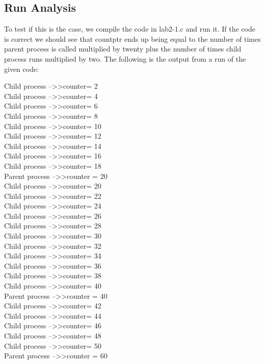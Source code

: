 \documentclass[12pt, titlepage]{article}
\begin{document}
\subsection*{Run Analysis}
\par{} 
To test if this is the case, we compile the code in lab2-1.c and run it. 
If the code is correct we should see that countptr ends up being equal to
the number of times parent process is called multiplied by twenty plus the number 
of times child process runs multiplied by two.
The following is the output from a run of the given code:
\begin{center}
	Child process --\textgreater\textgreater counter= 2\\
Child process --\textgreater\textgreater counter= 4\\
Child process --\textgreater\textgreater counter= 6\\
Child process --\textgreater\textgreater counter= 8\\
Child process --\textgreater\textgreater counter= 10\\
Child process --\textgreater\textgreater counter= 12\\
Child process --\textgreater\textgreater counter= 14\\
Child process --\textgreater\textgreater counter= 16\\
Child process --\textgreater\textgreater counter= 18\\
Parent process --\textgreater\textgreater counter = 20\\
Child process --\textgreater\textgreater counter= 20\\
Child process --\textgreater\textgreater counter= 22\\
Child process --\textgreater\textgreater counter= 24\\
Child process --\textgreater\textgreater counter= 26\\
Child process --\textgreater\textgreater counter= 28\\
Child process --\textgreater\textgreater counter= 30\\
Child process --\textgreater\textgreater counter= 32\\
Child process --\textgreater\textgreater counter= 34\\
Child process --\textgreater\textgreater counter= 36\\
Child process --\textgreater\textgreater counter= 38\\
Child process --\textgreater\textgreater counter= 40\\
Parent process --\textgreater\textgreater counter = 40\\
Child process --\textgreater\textgreater counter= 42\\
Child process --\textgreater\textgreater counter= 44\\
Child process --\textgreater\textgreater counter= 46\\
Child process --\textgreater\textgreater counter= 48\\
Child process --\textgreater\textgreater counter= 50\\
Parent process --\textgreater\textgreater counter = 60\\
\end{center}
\end{document}
